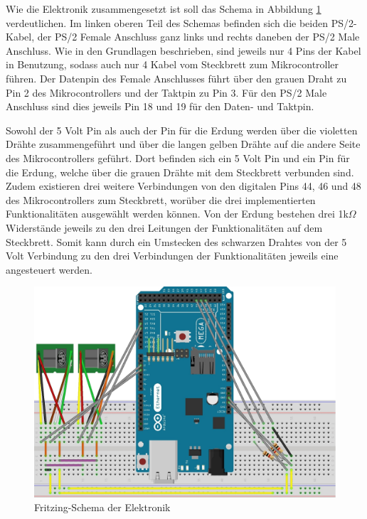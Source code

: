 Wie die Elektronik zusammengesetzt ist soll das Schema in Abbildung \ref{fritzing} verdeutlichen. Im linken oberen Teil des Schemas befinden sich die beiden PS/2-Kabel, der PS/2 Female Anschluss ganz links und rechts daneben der PS/2 Male Anschluss. Wie in den Grundlagen beschrieben, sind jeweils nur 4 Pins der Kabel in Benutzung, sodass auch nur 4 Kabel vom Steckbrett zum Mikrocontroller führen. Der Datenpin des Female Anschlusses führt über den grauen Draht zu Pin 2 des Mikrocontrollers und der Taktpin zu Pin 3. Für den PS/2 Male Anschluss sind dies jeweils Pin 18 und 19 für den Daten- und Taktpin.

Sowohl der 5 Volt Pin als auch der Pin für die Erdung werden über die violetten Drähte zusammengeführt und über die langen gelben Drähte auf die andere Seite des Mikrocontrollers geführt. Dort befinden sich ein 5 Volt Pin und ein Pin für die Erdung, welche über die grauen Drähte mit dem Steckbrett verbunden sind. Zudem existieren drei weitere Verbindungen von den digitalen Pins 44, 46 und 48 des Mikrocontrollers zum Steckbrett, worüber die drei implementierten Funktionalitäten ausgewählt werden können. Von der Erdung bestehen drei 1k$\Omega$ Widerstände jeweils zu den drei Leitungen der Funktionalitäten auf dem Steckbrett. Somit kann durch ein Umstecken des schwarzen Drahtes von der 5 Volt Verbindung zu den drei Verbindungen der Funktionalitäten jeweils eine angesteuert werden.
\begin{figure}
  \centering
  \includegraphics[width=1\textwidth]{images/fritzing.jpg}
  \caption{Fritzing-Schema der Elektronik}
  \label{fritzing}
\end{figure}

